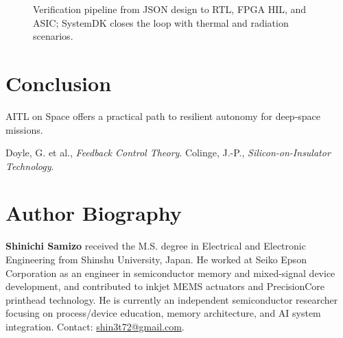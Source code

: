\documentclass[conference]{IEEEtran}
\begin{document}
\begin{figure}[t]
  \centering
  \caption{Verification pipeline from JSON design to RTL, FPGA HIL, and ASIC; SystemDK closes the loop with thermal and radiation scenarios.}
  \label{fig:pipeline}
\end{figure}

\section{Conclusion}
AITL on Space offers a practical path to resilient autonomy for deep-space missions.


\begin{thebibliography}{9}
 Doyle, G. et al., \emph{Feedback Control Theory}.
 Colinge, J.-P., \emph{Silicon-on-Insulator Technology}.
\end{thebibliography}

\section*{Author Biography}
\textbf{Shinichi Samizo} received the M.S. degree in Electrical and Electronic
Engineering from Shinshu University, Japan. He worked at Seiko Epson
Corporation as an engineer in semiconductor memory and mixed-signal
device development, and contributed to inkjet MEMS actuators and
PrecisionCore printhead technology. He is currently an independent
semiconductor researcher focusing on process/device education, memory
architecture, and AI system integration. Contact:
\href{mailto:shin3t72@gmail.com}{shin3t72@gmail.com}.
\end{document}
